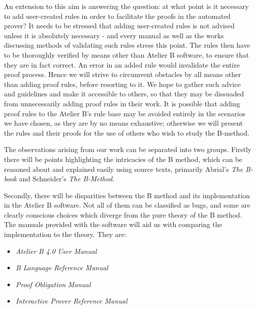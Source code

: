 \documentclass[11pt,journal]{IEEEtran}
\begin{document}
	An extension to this aim is answering the question: at what point is it necessary to add user-created rules in order to facilitate the proofs in the automated prover? It needs to be stressed that adding user-created rules is not advised unless it is absolutely necessary - and every manual as well as the works discussing methods of validating such rules stress this point. The rules then have to be thoroughly verified by means other than Atelier B software, to ensure that they are in fact correct. An error in an added rule would invalidate the entire proof process. Hence we will strive to circumvent obstacles by all means other than adding proof rules, before resorting to it. We hope to gather such advice and guidelines and make it accessible to others, so that they may be dissuaded from unnecessarily adding proof rules in their work. It is possible that adding proof rules to the Atelier B's rule base may be avoided entirely in the scenarios we have chosen, as they are by no means exhaustive; otherwise we will present the rules and their proofs for the use of others who wish to study the B-method.

	The observations arising from our work can be separated into two groups. Firstly there will be points highlighting the intricacies of the B method, which can be reasoned about and explained easily using source texts, primarily Abrial's \emph{The B-book}\cite{b-book} and Schneider's \emph{The B-Method}\cite{b-method}. 
	
	Secondly, there will be disparities between the B method and its implementation in the Atelier B software. Not all of them can be classified as bugs, and some are clearly conscious choices which diverge from the pure theory of the B method. The manuals provided with the software will aid us with comparing the implementation to the theory. They are:
	
	\begin{itemize}
		\item \emph{Atelier B 4.0 User Manual}\cite{user manual}
		\item \emph{B Language Reference Manual}\cite{b reference}
		\item \emph{Proof Obligation Manual}\cite{PO reference}
		\item \emph{Interactive Prover Reference Manual}\cite{Prover guide}
	\end{itemize}
	
\end{document}
